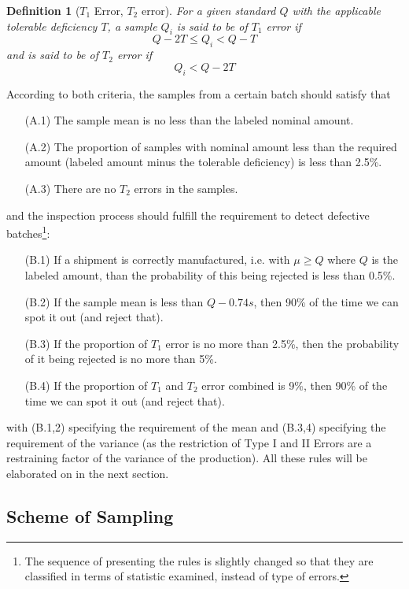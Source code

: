 \documentclass[12pt]{article}
\newtheorem{definition}{Definition}[section]
\begin{document}
\begin{definition}[$T_1$ Error, $T_2$ error]
    For a given standard $Q$ with the applicable tolerable deficiency $T$, a sample $Q_i$ is said to be of $T_1$ error if
    $$
    Q-2T \leq Q_i < Q-T
    $$
    and is said to be of $T_2$ error if
    $$
    Q_i < Q-2T
    $$
\end{definition}

According to both criteria, the samples from a certain batch should satisfy that
\begin{enumerate}
    \item[(A.1)] The sample mean is no less than the labeled nominal amount.
    \item[(A.2)] The proportion of samples with nominal amount less than the required amount (labeled amount minus the tolerable deficiency) is less than 2.5\%.
    \item[(A.3)] There are no $T_2$ errors in the samples. 
\end{enumerate}
and the inspection process should fulfill the requirement to detect defective batches\footnote{The sequence of presenting the rules is slightly changed so that they are classified in terms of statistic examined, instead of type of errors.}:
\begin{enumerate}
    \item[(B.1)] If a shipment is correctly manufactured, i.e. with $\mu\geq Q$ where $Q$ is the labeled amount, than the probability of this being rejected is less than 0.5\%.
    \item[(B.2)] If the sample mean is less than $Q-0.74s$, then 90\% of the time we can spot it out (and reject that).
    \item[(B.3)] If the proportion of $T_1$ error is no more than 2.5\%, then the probability of it being rejected is no more than 5\%.
    \item[(B.4)] If the proportion of $T_1$ and $T_2$ error combined is 9\%, then 90\% of the time we can spot it out (and reject that).
\end{enumerate}
with (B.1,2) specifying the requirement of the mean and (B.3,4) specifying the requirement of the variance (as the restriction of Type I and II Errors are a restraining factor of the variance of the production). All these rules will be elaborated on in the next section.

\subsection{Scheme of Sampling}
\end{document}
